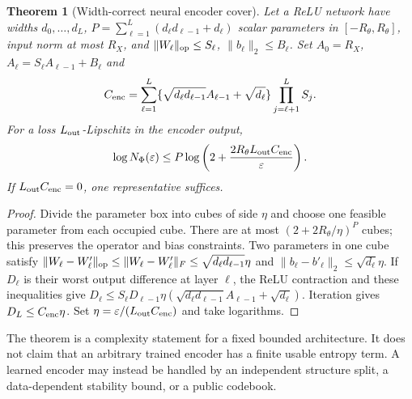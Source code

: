 \documentclass[11pt,a4paper]{article}
\numberwithin{equation}{section}
\newtheorem{theorem}{Theorem}[section]
\theoremstyle{definition}\newtheorem{definition}[theorem]{Definition}
\theoremstyle{remark}\newtheorem{remark}[theorem]{Remark}
\begin{document}
\begin{theorem}[Width-correct neural encoder cover]\label{thm:neuralcover}
Let a ReLU network have widths $d_0,\ldots,d_L$, $P=\sum_{\ell=1}^L(d_\ell d_{\ell-1}+d_\ell)$
scalar parameters in $[-R_\theta,R_\theta]$, input norm at most $R_X$, and
$\|W_\ell\|_{\rm op}\le S_\ell$, $\|b_\ell\|_2\le B_\ell$.
Set $A_0=R_X$, $A_\ell=S_\ell A_{\ell-1}+B_\ell$ and
\[
 C_{\rm enc}=\sum_{\ell=1}^L
 \{\sqrt{d_\ell d_{\ell-1}}A_{\ell-1}+\sqrt{d_\ell}\}
 \prod_{j=\ell+1}^LS_j.
\]
For a loss $L_{\rm out}$-Lipschitz in the encoder output,
\[
 \log N_\Phi(\varepsilon)
 \le P\log\left(2+\frac{2R_\theta L_{\rm out}C_{\rm enc}}{\varepsilon}\right).
\]
If $L_{\rm out}C_{\rm enc}=0$, one representative suffices.
\end{theorem}
\begin{proof}
Divide the parameter box into cubes of side $\eta$ and choose one feasible
parameter from each occupied cube. There are at most
$(2+2R_\theta/\eta)^P$ cubes; this preserves the operator and bias constraints.
Two parameters in one cube satisfy
$\|W_\ell-W'_\ell\|_{\rm op}\le\|W_\ell-W'_\ell\|_F
\le\sqrt{d_\ell d_{\ell-1}}\eta$ and
$\|b_\ell-b'_\ell\|_2\le\sqrt{d_\ell}\eta$.
If $D_\ell$ is their worst output difference at layer $\ell$, the ReLU
contraction and these inequalities give
$D_\ell\le S_\ell D_{\ell-1}
\eta(\sqrt{d_\ell d_{\ell-1}}A_{\ell-1}+\sqrt{d_\ell})$.
Iteration gives $D_L\le C_{\rm enc}\eta$. Set
$\eta=\varepsilon/(L_{\rm out}C_{\rm enc})$ and take logarithms.
\end{proof}
The theorem is a complexity statement for a fixed bounded architecture. It does not claim that an arbitrary trained encoder has a finite usable entropy term. A learned encoder may instead be handled by an independent structure split, a data-dependent stability bound, or a public codebook.
\end{document}
